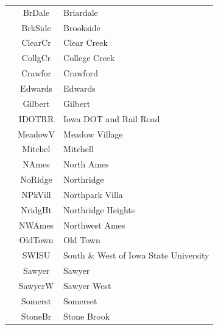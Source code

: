 \documentclass[11pt]{scrartcl} %
\begin{document}
\begin{center}
\begin{tabular}{c c c c c c}
\multicolumn{2}{|c}{} & \multicolumn{1}{c}{BrDale} & \multicolumn{3}{l|}{Briardale}\\
\multicolumn{2}{|c}{} & \multicolumn{1}{c}{BrkSide} & \multicolumn{3}{l|}{Brookside}\\
\multicolumn{2}{|c}{} & \multicolumn{1}{c}{ClearCr} & \multicolumn{3}{l|}{Clear Creek}\\
\multicolumn{2}{|c}{} & \multicolumn{1}{c}{CollgCr} & \multicolumn{3}{l|}{College Creek}\\
\multicolumn{2}{|c}{} & \multicolumn{1}{c}{Crawfor} & \multicolumn{3}{l|}{Crawford}\\
\multicolumn{2}{|c}{} & \multicolumn{1}{c}{Edwards} & \multicolumn{3}{l|}{Edwards}\\
\multicolumn{2}{|c}{} & \multicolumn{1}{c}{Gilbert} & \multicolumn{3}{l|}{Gilbert}\\
\multicolumn{2}{|c}{} & \multicolumn{1}{c}{IDOTRR} & \multicolumn{3}{l|}{Iowa DOT and Rail Road}\\
\multicolumn{2}{|c}{} & \multicolumn{1}{c}{MeadowV} & \multicolumn{3}{l|}{Meadow Village}\\
\multicolumn{2}{|c}{} & \multicolumn{1}{c}{Mitchel} & \multicolumn{3}{l|}{Mitchell}\\
\multicolumn{2}{|c}{} & \multicolumn{1}{c}{NAmes} & \multicolumn{3}{l|}{North Ames}\\
\multicolumn{2}{|c}{} & \multicolumn{1}{c}{NoRidge} & \multicolumn{3}{l|}{Northridge}\\
\multicolumn{2}{|c}{} & \multicolumn{1}{c}{NPkVill} & \multicolumn{3}{l|}{Northpark Villa}\\
\multicolumn{2}{|c}{} & \multicolumn{1}{c}{NridgHt} & \multicolumn{3}{l|}{Northridge Heights}\\
\multicolumn{2}{|c}{} & \multicolumn{1}{c}{NWAmes} & \multicolumn{3}{l|}{Northwest Ames}\\
\multicolumn{2}{|c}{} & \multicolumn{1}{c}{OldTown} & \multicolumn{3}{l|}{Old Town}\\
\multicolumn{2}{|c}{} & \multicolumn{1}{c}{SWISU} & \multicolumn{3}{l|}{South \& West of Iowa State University}\\
\multicolumn{2}{|c}{} & \multicolumn{1}{c}{Sawyer} & \multicolumn{3}{l|}{Sawyer}\\
\multicolumn{2}{|c}{} & \multicolumn{1}{c}{SawyerW} & \multicolumn{3}{l|}{Sawyer West}\\
\multicolumn{2}{|c}{} & \multicolumn{1}{c}{Somerst} & \multicolumn{3}{l|}{Somerset}\\
\multicolumn{2}{|c}{} & \multicolumn{1}{c}{StoneBr} & \multicolumn{3}{l|}{Stone Brook}\\

\end{tabular}
\end{center}
\end{document}
